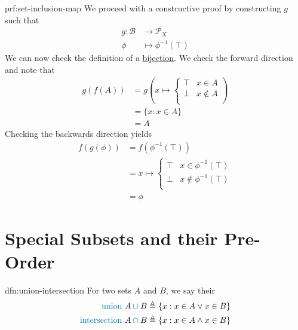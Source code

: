 \begin{prf}{prf:set-inclusion-map}
    We proceed with a constructive proof by constructing \( g \) such that
    \begin{align*}
        g : \mathcal{B} &\to \mathcal{P}_{X} \\
        \phi &\mapsto \phi^{-1}(\top)
    \end{align*}
    We can now check the definition of a \hyperref[dfn:bijection]{bijection}.
    We check the forward direction and note that
    \begin{align*}
        g(f(A)) &= g
        \left(
            x \mapsto
            \begin{cases}
                \top & x \in A \\
                \bot & x \notin A \\
            \end{cases}
        \right) \\
        &= \{ x : x \in A \} \\
        &= A
    \end{align*}
    Checking the backwards direction yields
    \begin{align*}
        f(g(\phi)) &= f\left( \phi^{-1}(\top) \right) \\
        &= x \mapsto
            \begin{cases}
                \top & x \in \phi^{-1}(\top) \\
                \bot & x \notin \phi^{-1}(\top) \\
            \end{cases} \\
        &= \phi
    \end{align*}
\end{prf}

\section{Special Subsets and their Pre-Order}\label{sec:subsets}

\begin{dfn}{dfn:union-intersection}
    For two sets \( A \) and \( B \), we say their
    \begin{align*}
        \text{\textcolor{dfn-color}{union} } & A \mathbin{\textcolor{dfn-color}{\cup}} B \triangleq \{ x : x \in A \lor x \in B \} \\
        \text{\textcolor{dfn-color}{intersection} } & A \mathbin{\textcolor{dfn-color}{\cap}} B \triangleq \{ x : x \in A \land x \in B \}
    \end{align*}
\end{dfn}

